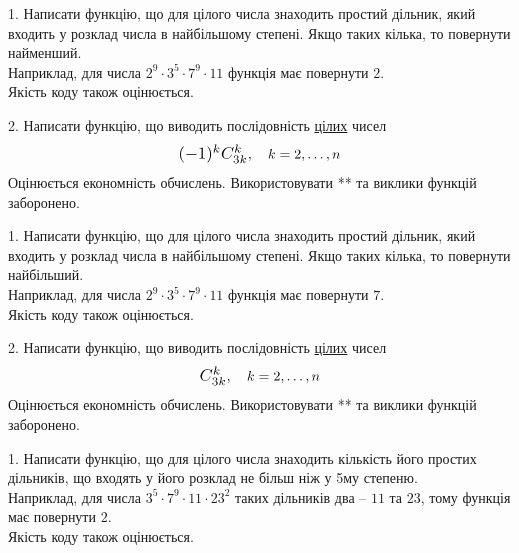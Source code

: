 \documentclass[12pt, ukrainian]{article}
\begin{document}
\begin{Large}

1. Написати функцію, що для цілого числа знаходить простий дільник, який входить у розклад числа в найбільшому степені. Якщо таких кілька, то повернути найменший. \\ Наприклад, для числа $2^{9}{\cdot}3^5{\cdot}7^9{\cdot}11$ функція має повернути $2$.\\	Якість коду також оцінюється. 



\vspace{10mm}

\newpage

2. 
Написати функцію, що виводить послідовність \underline{цілих} чисел
$$\scalebox{1.2}{$(-1)^{k}C_{3k}^{k}$}, \quad k=2,\ldots,n$$
Оцінюється економність обчислень. Використовувати ** та виклики функцій заборонено.

\newpage




1. Написати функцію, що для цілого числа знаходить простий дільник, який входить у розклад числа в найбільшому степені. Якщо таких кілька, то повернути найбільший. \\ Наприклад, для числа $2^{9}{\cdot}3^5{\cdot}7^9{\cdot}11$ функція має повернути $7$.\\	Якість коду також оцінюється. 



\vspace{10mm}

\newpage

2. 
Написати функцію, що виводить послідовність \underline{цілих} чисел
$$\scalebox{1.2}{$C_{3k}^{k}$}, \quad k=2,\ldots,n$$
Оцінюється економність обчислень. Використовувати ** та виклики функцій заборонено.

\newpage




1. Написати функцію, що для цілого числа знаходить кількість його простих дільників, що входять у його розклад не більш ніж у 5му степеню. \\ Наприклад, для числа $3^5{\cdot}7^9{\cdot}11{\cdot}23^{2}$ таких дільників два – $11$ та $23$, тому функція має повернути $2$.\\	Якість коду також оцінюється. 




\end{Large}
\end{document}
